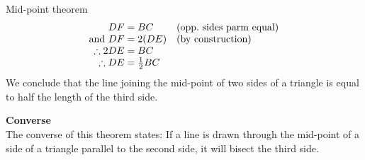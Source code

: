 \begin{wex}{Mid-point theorem}
{  
  \begin{equation*}
    \begin{array}{r@{\;}l@{\quad}l}
      DF &= BC & \mbox{(opp.\ sides parm equal)}\\
      \mbox{and } DF &= 2(DE) & \mbox{(by construction)} \\
      \therefore 2DE &= BC & \\
      \therefore DE &= \frac{1}{2}BC &\\
    \end{array}
  \end{equation*}
  We conclude that the line joining the mid-point of two sides of a triangle is equal to half the length of the third side.
}
\end{wex}

\textbf{Converse}\\
The converse of this theorem states: If a line is drawn through the mid-point of a side of a triangle parallel to the second side, it will bisect the third side.

